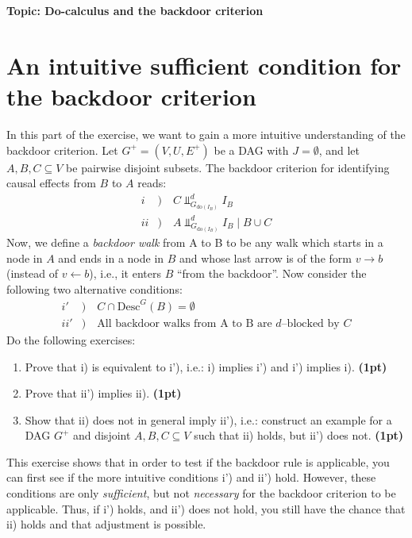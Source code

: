 

\flushleft\textbf{Topic: Do-calculus and the backdoor criterion}
\section{An intuitive sufficient condition for the backdoor criterion}

In this part of the exercise, we want to gain a more intuitive understanding of the backdoor criterion. 
    Let $G^{+} = (V, U, E^{+})$ be a DAG with $J = \emptyset$, and let $A, B, C \subseteq V$ be pairwise disjoint subsets. 
    The backdoor criterion for identifying causal effects from $B$ to $A$ reads:
    \begin{align*}
     i & )  \quad   C    \Perp^d_{G_{\text{do}(I_B)}} I_B   \\
   ii & )  \quad    A    \Perp^d_{G_{\text{do}(I_B)}} I_B \mid B \cup C
    \end{align*}
    Now, we define a \emph{backdoor walk} from A to B to be any walk which starts in a node in $A$ and ends in a node in $B$ and whose last arrow is of the form $v \rightarrow b$ (instead of $v \leftarrow b$), i.e., it enters $B$ ``from the backdoor''.
    Now consider the following two alternative conditions:
    \begin{align*}
    i' & ) \quad   C \cap \text{Desc}^G(B) = \emptyset \\
  ii' & ) \quad   \text{All backdoor walks from A to B are $d$--blocked by $C$} 
    \end{align*}
    Do the following exercises:
    \begin{enumerate}
\item Prove that i) is equivalent to i'), i.e.: i) implies i') and i') implies i).  \textbf{(1pt)} 
      \item Prove that ii') implies ii).  \textbf{(1pt)} 
\item Show that ii) does not in general imply ii'), i.e.: construct an example for a DAG $G^+$ and disjoint $A, B, C \subseteq V$ such that ii) holds, but ii') does not. \textbf{(1pt)} 
      \end{enumerate}
  This exercise shows that in order to test if the backdoor rule is applicable, you can first see if the more intuitive conditions i') and ii') hold.
      However, these conditions are only \emph{sufficient}, but not \emph{necessary} for the backdoor criterion to be applicable.
Thus, if i') holds, and ii') does not hold, you still have the chance that ii) holds and that adjustment is possible.


